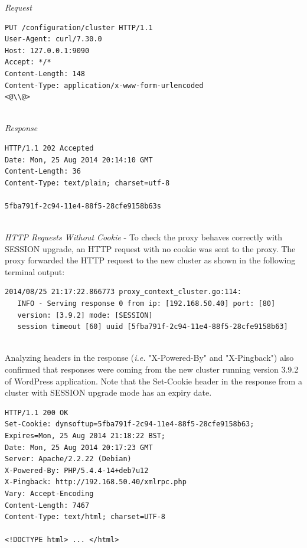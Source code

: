 \documentclass[a4paper,11pt,twoside]{report}
\begin{document}
\noindent
\textit{Request}
\begin{lstlisting}[language=terminal]
PUT /configuration/cluster HTTP/1.1
User-Agent: curl/7.30.0
Host: 127.0.0.1:9090
Accept: */*
Content-Length: 148
Content-Type: application/x-www-form-urlencoded
<@\\@>
\end{lstlisting}

\noindent\\
\textit{Response}
\begin{lstlisting}[language=terminal]
HTTP/1.1 202 Accepted
Date: Mon, 25 Aug 2014 20:14:10 GMT
Content-Length: 36
Content-Type: text/plain; charset=utf-8

5fba791f-2c94-11e4-88f5-28cfe9158b63s
\end{lstlisting}  

\noindent\\
\textit{HTTP Requests Without Cookie} - To check the proxy behaves correctly with SESSION upgrade, an HTTP request with no cookie was sent to the proxy. The proxy forwarded the HTTP request to the new cluster as shown in the following terminal output: \smallskip   


\begin{lstlisting}[language=terminal]
2014/08/25 21:17:22.866773 proxy_context_cluster.go:114:     
   INFO - Serving response 0 from ip: [192.168.50.40] port: [80] 
   version: [3.9.2] mode: [SESSION] 
   session timeout [60] uuid [5fba791f-2c94-11e4-88f5-28cfe9158b63]
\end{lstlisting}

\noindent\\
Analyzing headers in the response (\textit{i.e.} "X-Powered-By" and "X-Pingback") also confirmed that responses were coming from the new cluster running version 3.9.2 of WordPress application. Note that the Set-Cookie header in the response from a cluster with SESSION upgrade mode has an expiry date. \smallskip 

\begin{lstlisting}[language=terminal]
HTTP/1.1 200 OK
Set-Cookie: dynsoftup=5fba791f-2c94-11e4-88f5-28cfe9158b63; Expires=Mon, 25 Aug 2014 21:18:22 BST;
Date: Mon, 25 Aug 2014 20:17:23 GMT
Server: Apache/2.2.22 (Debian)
X-Powered-By: PHP/5.4.4-14+deb7u12
X-Pingback: http://192.168.50.40/xmlrpc.php
Vary: Accept-Encoding
Content-Length: 7467
Content-Type: text/html; charset=UTF-8

<!DOCTYPE html> ... </html>
\end{lstlisting}
\end{document}
